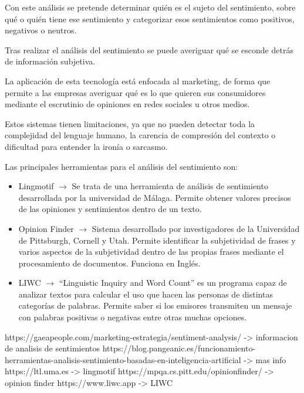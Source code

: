 Con este análisis se pretende determinar quién es el sujeto del sentimiento, sobre qué o quién tiene ese sentimiento y categorizar esos sentimientos como positivos, negativos o neutros.

Tras realizar el análisis del sentimiento se puede averiguar qué se esconde detrás de información subjetiva.

La aplicación de esta tecnología está enfocada al marketing, de forma que permite a las empresas averiguar qué es lo que quieren sus consumidores mediante el escrutinio de opiniones en redes sociales u otros medios.

Estos sistemas tienen limitaciones, ya que no pueden detectar toda la complejidad del lenguaje humano, la carencia de compresión del contexto o dificultad para entender la ironía o sarcasmo.

Las principales herramientas para el análisis del sentimiento son:
\begin{itemize}
	\item Lingmotif $\rightarrow$ Se trata de una herramienta de análisis de sentimiento desarrollada por la universidad de Málaga. Permite obtener valores precisos de las opiniones y sentimientos dentro de un texto.
	\item Opinion Finder $\rightarrow$ Sistema desarrollado por investigadores de la Universidad de Pittsburgh, Cornell y Utah. Permite identificar la subjetividad de frases y varios aspectos de la subjetividad dentro de las propias frases mediante el procesamiento de documentos. Funciona en Inglés.
	\item LIWC $\rightarrow$ ``Linguistic Inquiry and Word Count'' es un programa capaz de analizar textos para calcular el uso que hacen las personas de distintas categorías de palabras. Permite saber si los emisores transmiten un mensaje con palabras positivas o negativas entre otras muchas opciones.
\end{itemize}



https://gaeapeople.com/marketing-estrategia/sentiment-analysis/ -> informacion de analisis de sentimientos
https://blog.pangeanic.es/funcionamiento-herramientas-analisis-sentimiento-basadas-en-inteligencia-artificial -> mas info
https://ltl.uma.es -> lingmotif
https://mpqa.cs.pitt.edu/opinionfinder/ -> opinion finder
https://www.liwc.app -> LIWC